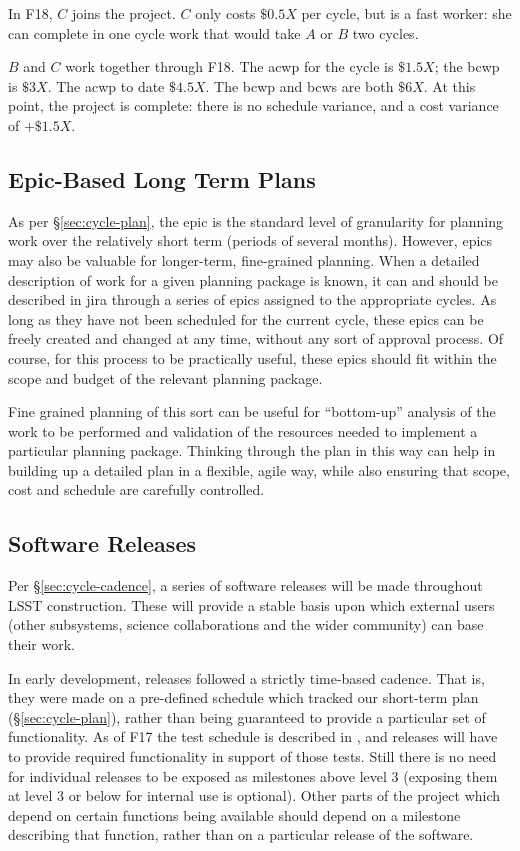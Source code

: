 In F18, \(C\) joins the project.
\(C\) only costs \(\$0.5X\) per \gls{cycle}, but is a fast worker: she can complete in one \gls{cycle} work that would take \(A\) or \(B\) two \glspl{cycle}.

\(B\) and \(C\) work together through F18.
The \gls{acwp} for the \gls{cycle} is \(\$1.5X\); the \gls{bcwp} is \(\$3X\). The \gls{acwp} to date \(\$4.5X\).
The \gls{bcwp} and \gls{bcws} are both \(\$6X\).
At this point, the project is complete: there is no schedule variance, and a cost variance of \(+\$1.5X\).

\subsection{Epic-Based Long Term Plans}

As per \S\ref{sec:cycle-plan}, the \gls{epic} is the standard level of granularity for planning work over the relatively short term (periods of several months).
However, \glspl{epic} may also be valuable for longer-term, fine-grained planning.
When a detailed description of work for a given planning package is known, it can and should be described in \gls{jira} through a series of \glspl{epic} assigned to the appropriate \glspl{cycle}.
As long as they have not been scheduled for the current \gls{cycle}, these \glspl{epic} can be freely created and changed at any time, without any sort of approval process.
Of course, for this process to be practically useful, these \glspl{epic} should fit within the scope and budget of the relevant planning package.

Fine grained planning of this sort can be useful for ``bottom-up''
analysis of the work to be performed and validation of the resources
needed to implement a particular planning package. Thinking through the
plan in this way can help in building up a detailed plan in a flexible,
agile way, while also ensuring that scope, cost and schedule are
carefully controlled.

\subsection{Software Releases}
\label{sec:releases}

Per \S\ref{sec:cycle-cadence}, a series of software releases will be made
throughout LSST construction. These will provide a stable basis upon
which external users (other subsystems, science collaborations and the
wider community) can base their work.

In early development, releases followed a strictly time-based cadence.
That is, they were made on a pre-defined schedule which tracked our short-term plan (\S\ref{sec:cycle-plan}), rather than being guaranteed to provide a particular set of functionality.
As of F17 the test schedule is described in , and releases will have to provide required functionality in support of those tests.
Still there is no need for individual releases to be exposed as milestones above level 3 (exposing them at level 3 or below for internal use is optional).
Other parts of the project which depend on certain functions being available should depend on a milestone describing that function, rather than on a particular release of the software.


